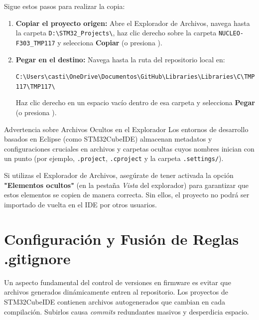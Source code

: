 \documentclass[
10pt, %
a4paper, %
oneside, %
headinclude,footinclude, %
BCOR5mm, %
]{scrartcl}
\begin{document}
Sigue estos pasos para realizar la copia:
\begin{enumerate}
	\item \textbf{Copiar el proyecto origen:} Abre el Explorador de Archivos, navega hasta la carpeta \texttt{D:\textbackslash STM32\_Projects\textbackslash}, haz clic derecho sobre la carpeta \texttt{NUCLEO-F303\_TMP117} y selecciona \textbf{Copiar} (o presiona ).
	\item \textbf{Pegar en el destino:} Navega hasta la ruta del repositorio local en:
		\begin{center}
			\texttt{C:\textbackslash Users\textbackslash casti\textbackslash OneDrive\textbackslash Documentos\textbackslash GitHub\textbackslash Libraries\textbackslash Libraries\textbackslash C\textbackslash TMP117\textbackslash TMP117\textbackslash}
		\end{center}
		Haz clic derecho en un espacio vacío dentro de esa carpeta y selecciona \textbf{Pegar} (o presiona ).
\end{enumerate}

\begin{WarningBox}{Advertencia sobre Archivos Ocultos en el Explorador}
	Los entornos de desarrollo basados en Eclipse (como STM32CubeIDE) almacenan metadatos y configuraciones cruciales en archivos y carpetas ocultas cuyos nombres inician con un punto (por ejemplo, \texttt{.project}, \texttt{.cproject} y la carpeta \texttt{.settings/}).
	
	Si utilizas el Explorador de Archivos, asegúrate de tener activada la opción \textbf{"Elementos ocultos"} (en la pestaña \textit{Vista} del explorador) para garantizar que estos elementos se copien de manera correcta. Sin ellos, el proyecto no podrá ser importado de vuelta en el IDE por otros usuarios.
\end{WarningBox}

\newpage
\section{Configuración y Fusión de Reglas .gitignore}

Un aspecto fundamental del control de versiones en firmware es evitar que archivos generados dinámicamente entren al repositorio. Los proyectos de STM32CubeIDE contienen archivos autogenerados que cambian en cada compilación. Subirlos causa \textit{commits} redundantes masivos y desperdicia espacio.
\end{document}
